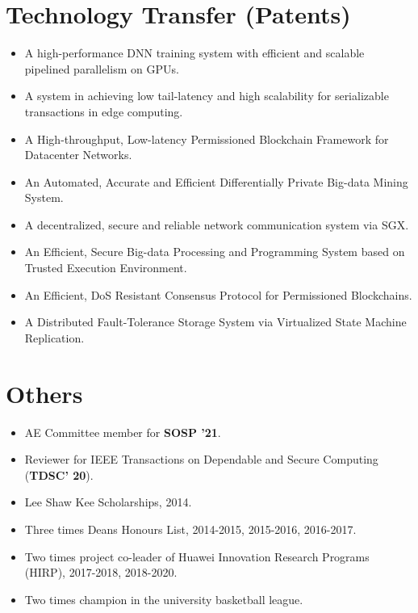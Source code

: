 \documentclass[a4paper,7pt]{article} %
\begin{document}
\section{Technology Transfer (Patents)}
\begin{itemize}
    \item A high-performance DNN training system with efficient and scalable pipelined parallelism on GPUs.
    \item A system in achieving low tail-latency and high scalability for serializable transactions in edge computing.
    \item A High-throughput, Low-latency Permissioned Blockchain Framework for Datacenter Networks.
    \item An Automated, Accurate and Efficient Differentially Private Big-data Mining System.
    \item A decentralized, secure and reliable network communication system via SGX.
    \item An Efficient, Secure Big-data Processing and Programming System based on Trusted Execution Environment.
    \item An Efficient, DoS Resistant Consensus Protocol for Permissioned Blockchains.
    \item A Distributed Fault-Tolerance Storage System via Virtualized State Machine Replication.

\end{itemize}





\section{Others}
\begin{itemize}
\item AE Committee member for \textbf{SOSP '21}.
\item Reviewer for IEEE Transactions on Dependable and Secure Computing (\textbf{TDSC' 20}).
\item Lee Shaw Kee Scholarships, 2014.
\item Three times Deans Honours List, 2014-2015, 2015-2016, 2016-2017. 
\item Two times project co-leader of Huawei Innovation Research Programs (HIRP), 2017-2018, 2018-2020.
\item Two times champion in the university basketball league.
\end{itemize}
\end{document}
